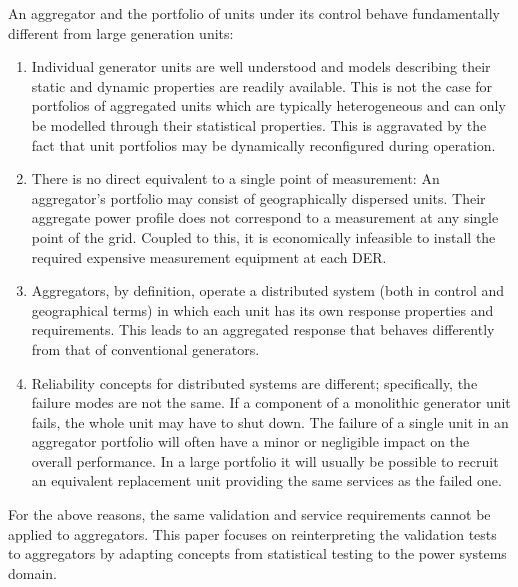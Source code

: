 An aggregator and the portfolio of units under its control behave fundamentally different from large generation units:
\begin{enumerate}
\item Individual generator units are well understood and models describing their static and dynamic properties are readily available. This is not the case for portfolios of aggregated units which are typically heterogeneous and can only be modelled through their statistical properties. This is aggravated by the fact that unit portfolios may be dynamically reconfigured during operation.
\item There is no direct equivalent to a single point of measurement: An aggregator's portfolio may consist of geographically dispersed units. Their aggregate power profile does not correspond to a measurement at any single point of the grid. Coupled to this, it is economically infeasible to install the required expensive measurement equipment at each DER.
\item Aggregators, by definition, operate a distributed system (both in control and geographical terms) in which each unit has its own response properties and requirements. This leads to an aggregated response that behaves differently from that of conventional generators.
\item Reliability concepts for distributed systems are different; specifically, the failure modes are not the same. If a component of a monolithic generator unit fails, the whole unit may have to shut down. The failure of a single unit in an aggregator portfolio will often have a minor or negligible impact on the overall performance. In a large portfolio it will usually be possible to recruit an equivalent replacement unit providing the same services as the failed one.
\end{enumerate}

For the above reasons, the same validation and service requirements cannot be applied to aggregators. This paper focuses on reinterpreting the validation tests to aggregators by adapting concepts from statistical testing to the power systems domain. 



